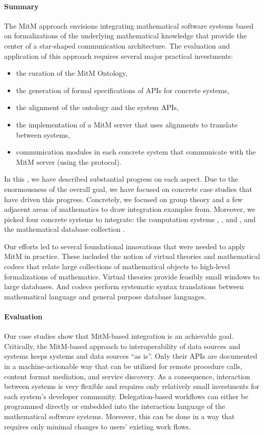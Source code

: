 \paragraph{Summary}
The MitM approach envisions integrating mathematical software systems based on formalizations of the underlying mathematical knowledge that provide the center of a star-shaped communication architecture.
The evaluation and application of this approach requires several major practical investments:
\begin{itemize}
\item the curation of the MitM Ontology,
\item the generation of formal specifications of APIs for concrete systems,
\item the alignment of the ontology and the system APIs,
\item the implementation of a MitM server that uses alignments to translate between systems,
\item communication modules in each concrete system that communicate with the MitM server (using the \SCSCP protocol).
\end{itemize}

In this \papertype, we have described substantial progress on each aspect.
Due to the enormousness of the overall goal, we have focused on concrete case studies that have driven this progress.
Concretely, we focused on group theory and a few adjacent areas of mathematics to draw integration examples from.
Moreover, we picked four concrete systems to integrate: the computation systems \Sage, \GAP, and \Singular, and the mathematical database collection \lmfdb.

Our efforts led to several foundational innovations that were needed to apply MitM in practice.
These included the notion of virtual theories and mathematical codecs that relate large collections of mathematical objects to high-level formalizations of mathematics.
Virtual theories provide feasibly small windows to large databases.
And codecs perform systematic syntax translations between mathematical language and general purpose database languages.

\paragraph{Evaluation} 

Our case studies show that MitM-based integration is an achievable goal.
Critically, the MitM-based approach to interoperability of data sources and systems keeps systems and data sources ``as is''.
Only their APIs are documented in a machine-actionable way that can be utilized for remote procedure calls, content format mediation, and service discovery.
As a consequence, interaction between systems is very flexible and requires only relatively small investments for each system's developer community.
Delegation-based workflows can either be programmed directly or embedded into the interaction language of the mathematical software systems.
Moreover, this can be done in a way that requires only minimal changes to users' existing work flows.

